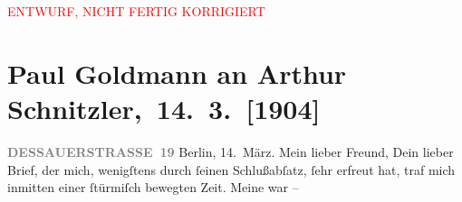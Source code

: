 
\begin{center}
            \textcolor{red}{ENTWURF, NICHT FERTIG KORRIGIERT}
                      \end{center}
            
         
         \renewcommand{\erwaehntePersonen}{Personen: Theodore Rottenberg, Olga Schnitzler, Heinrich Schnitzler}
         \renewcommand{\erwaehnteOrte}{Orte: Berlin, Dessauer Straße, Deutsches Theater Berlin, Italien, Neapel, Palermo, Pompei, Rom, Sizilien, Taormina, Wien}
         \renewcommand{\erwaehnteWerke}{Werke: Berliner Theater. »Der einsame Weg«. Von Arthur Schnitzler, Der einsame Weg. Schauspiel in fünf Akten, Neue Freie Presse}
               \section[ Paul Goldmann an Arthur Schnitzler, 14. 3. {[}1904{]}]{ Paul Goldmann an Arthur Schnitzler, 14. 3. {[}1904{]}}\nopagebreak{}\rehead{ }\begin{ledgroupsized}[t]{13cm}\normalsize\beginnumbering \toendnotes[C]{\smallbreak\pagebreak[2]} 
\toendnotes[C]{\smallbreak}\pstart
           \noindent{}\raggedleft{}{\pb}\textcolor{gray}{\textbf{DESSAUERSTRASSE 19}}\pend
           \pstart
           Berlin, 14. März.\pend
           \pstart{}Mein lieber Freund,\pend\pstart
           Dein lieber Brief, der mich, wenigſtens durch ſeinen Schlußabſatz, ſehr erfreut hat,
               traf mich inmitten einer ſtürmiſch  bewegten Zeit.
               Meine \label{K_L03440-1v}\label{K_L03440-1h} war –

\end{ledgroupsized}
